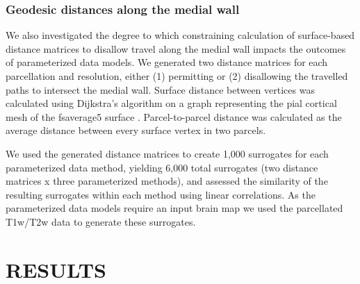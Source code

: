 \documentclass[12pt,aps,pra,reprint,showkeys]{revtex4-1}
\begin{document}
\subsubsection*{Geodesic distances along the medial wall}

We also investigated the degree to which constraining calculation of surface-based distance matrices to disallow travel along the medial wall impacts the outcomes of parameterized data models.
We generated two distance matrices for each parcellation and resolution, either (1) permitting or (2) disallowing the travelled paths to intersect the medial wall.
Surface distance between vertices was calculated using Dijkstra's algorithm on a graph representing the pial cortical mesh of the fsaverage5 surface \citep{fischl1999humanbrainmap}.
Parcel-to-parcel distance was calculated as the average distance between every surface vertex in two parcels.

We used the generated distance matrices to create 1,000 surrogates for each parameterized data method, yielding 6,000 total surrogates (two distance matrices x three parameterized methods), and assessed the similarity of the resulting surrogates within each method using linear correlations.
As the parameterized data models require an input brain map we used the parcellated T1w/T2w data to generate these surrogates.

\section*{RESULTS}
\end{document}
